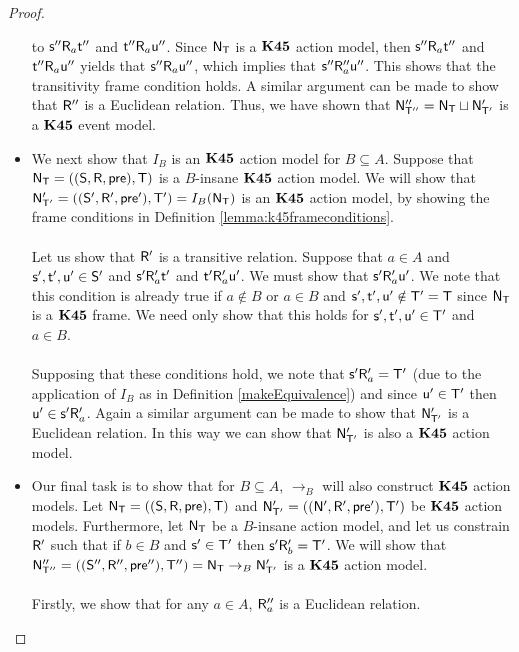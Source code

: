 \begin{proof}
\begin{itemize}
	to $\evs'' \evR_a \evt''$ and $\evt'' \evR_a \evu''$.
	Since $\evM_\evT$ is a $\AXKFF$ action model, then $\evs'' \evR_a \evt''$ and $\evt'' \evR_a \evu''$
	yields that $\evs'' \evR_a \evu''$, which implies that $\evs'' \evR''_a \evu''$.
	This shows that the transitivity frame condition holds.
	A similar argument can be made to show that $\evR''$ is a Euclidean relation.
	Thus, we have shown that $\evM''_{\evT''} = \evM_\evT \sqcup \evM'_{\evT'}$ is a $\AXKFF$ event
	model.
		\item We next show that $I_B$ is an $\AXKFF$ action model for $B \subseteq A$.
	Suppose that $\evM_\evT = ((\evS,\evR,\evpr),\evT)$ is a $B$-insane $\AXKFF$ action model.
	We will show that $\evM'_{\evT'} = ((\evS',\evR',\evpr'),\evT') = I_B(\evM_\evT)$ is an $\AXKFF$ action model, by showing the frame conditions in
	Definition \ref{lemma:k45frameconditions}.\\
	\\
	Let us show that $\evR'$ is a transitive relation.
	Suppose that $a \in A$ and $\evs', \evt', \evu' \in \evS'$ and $\evs' \evR'_a \evt'$ and $\evt'
	\evR'_a \evu'$.
	We must show that $\evs' \evR'_a \evu'$.
	We note that this condition is already true if $a \notin B$ or $a \in B$ and
  $\evs', \evt', \evu' \notin \evT' = \evT$ since $\evM_\evT$ is a $\AXKFF$
  frame.
  We need only show that this holds for $\evs', \evt', \evu' \in \evT'$ and $a
  \in B$.\\
  \\
  Supposing that these conditions hold, we note that $\evs' \evR'_a = \evT'$
  (due to the application of $I_B$ as in Definition \ref{makeEquivalence}) and
  since $\evu' \in \evT'$ then $\evu' \in \evs' \evR'_a$.
  Again a similar argument can be made to show that $\evM'_{\evT'}$ is a
  Euclidean relation.
  In this way we can show that $\evM'_{\evT'}$ is also a $\AXKFF$ action model.
		\item Our final task is to show that for $B \subseteq A$, $\to_B$ will also
  construct $\AXKFF$ action models.
  Let $\evM_\evT = ((\evS,\evR,\evpr),\evT)$ and $\evM'_{\evT'} =
  ((\evM',\evR',\evpr'),\evT')$ be $\AXKFF$ action models.
  Furthermore, let $\evM_{\evT}$ be a $B$-insane action model, and let us
  constrain $\evR'$ such that if $b \in B$ and $\evs' \in \evT'$ then $\evs'
  \evR'_b = \evT'$.
  We will show that $\evM''_{\evT''} = ((\evS'',\evR'',\evpr''),\evT'') = \evM_\evT \to_B
  \evM'_{\evT'}$ is a $\AXKFF$ action model.\\
  \\
  Firstly, we show that for any $a \in A$, $\evR''_a$ is a Euclidean relation.

\end{itemize}
\end{proof}
